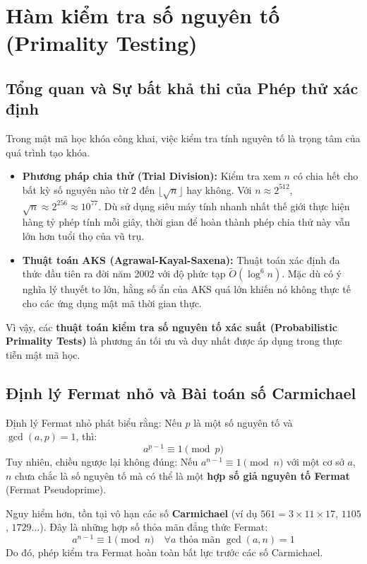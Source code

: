 \documentclass[12pt,a4paper]{article}
\theoremstyle{plain}
\begin{document}
\newpage
\section{Hàm kiểm tra số nguyên tố (Primality Testing)}

\subsection{Tổng quan và Sự bất khả thi của Phép thử xác định}
Trong mật mã học khóa công khai, việc kiểm tra tính nguyên tố là trọng tâm của quá trình tạo khóa. 
\begin{itemize}
    \item \textbf{Phương pháp chia thử (Trial Division):} Kiểm tra xem $n$ có chia hết cho bất kỳ số nguyên nào từ $2$ đến $\lfloor\sqrt{n}\rfloor$ hay không. Với $n \approx 2^{512}$, $\sqrt{n} \approx 2^{256} \approx 10^{77}$. Dù sử dụng siêu máy tính nhanh nhất thế giới thực hiện hàng tỷ phép tính mỗi giây, thời gian để hoàn thành phép chia thử này vẫn lớn hơn tuổi thọ của vũ trụ.
    \item \textbf{Thuật toán AKS (Agrawal-Kayal-Saxena):} Thuật toán xác định đa thức đầu tiên ra đời năm 2002 với độ phức tạp $\tilde{O}(\log^6 n)$. Mặc dù có ý nghĩa lý thuyết to lớn, hằng số ẩn của AKS quá lớn khiến nó không thực tế cho các ứng dụng mật mã thời gian thực.
\end{itemize}
Vì vậy, các \textbf{thuật toán kiểm tra số nguyên tố xác suất (Probabilistic Primality Tests)} là phương án tối ưu và duy nhất được áp dụng trong thực tiễn mật mã học.

\subsection{Định lý Fermat nhỏ và Bài toán số Carmichael}
Định lý Fermat nhỏ phát biểu rằng: Nếu $p$ là một số nguyên tố và $\gcd(a, p) = 1$, thì:
\begin{equation}
a^{p-1} \equiv 1 \pmod p
\end{equation}
Tuy nhiên, chiều ngược lại không đúng: Nếu $a^{n-1} \equiv 1 \pmod n$ với một cơ sở $a$, $n$ chưa chắc là số nguyên tố mà có thể là một \textbf{hợp số giả nguyên tố Fermat} (Fermat Pseudoprime).

Nguy hiểm hơn, tồn tại vô hạn các số \textbf{Carmichael} (ví dụ $561 = 3 \times 11 \times 17$, $1105$, $1729$...). Đây là những hợp số thỏa mãn đẳng thức Fermat:
\begin{equation}
a^{n-1} \equiv 1 \pmod n \quad \forall a \text{ thỏa mãn } \gcd(a, n) = 1
\end{equation}
Do đó, phép kiểm tra Fermat hoàn toàn bất lực trước các số Carmichael.
\end{document}
